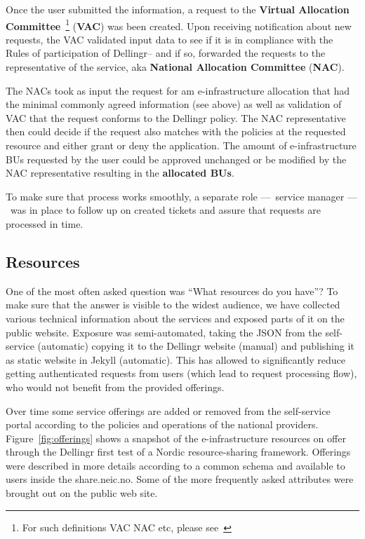 \documentclass{article}
\newcommand{\dell}{Dellingr\xspace}
\newcommand{\einfra}{e-infrastructure\xspace}
\newcommand{\np}{national provider\xspace}
\newcommand{\nps}{\np{s}\xspace}
\newcommand{\pilot}{first test of a Nordic resource-sharing framework\xspace}
\begin{document}
Once the user submitted the information, a request to the \textbf{Virtual Allocation Committee}~\footnote{For such definitions VAC NAC etc, please see~\cite{dellingr-p2-do5}} (\textbf{VAC}) was been created. 
Upon receiving notification about new requests, the VAC validated input data to see if it is in compliance
with the Rules of participation of \dell -- and if so, forwarded the requests to the representative of the service,
aka \textbf{National Allocation Committee} (\textbf{NAC}).

The NACs took as input the request for am \einfra allocation that had the minimal commonly agreed information (see above)
as well as validation of VAC that the request conforms to the \dell policy. 
The NAC representative then could decide if the request also matches with
the policies at the requested resource and either grant or deny the application.
The amount of \einfra BUs requested by the user could be approved unchanged or be modified by the NAC representative resulting in the {\bf allocated BUs}.

To make sure that process works smoothly, a separate role –– service manager –– was in place to follow up on created tickets and assure that requests are processed in time.

\subsection{Resources}

One of the most often asked question was ``What resources do you have''?
To make sure that the answer is visible to the widest audience, we have collected various
technical information about the services and exposed parts of it on the public website.
Exposure was semi-automated, taking the JSON from the self-service (automatic) copying it to
the \dell website (manual) and publishing it as static website in Jekyll (automatic).
This has allowed to significantly reduce getting authenticated requests from users (which lead to request processing flow), who would not benefit from the provided offerings.  

Over time some service offerings are added or removed from the self-service portal according to the
policies and operations of the \nps.
Figure~\ref{fig:offerings} shows a snapshot of the \einfra resources on offer through the \dell \pilot.
Offerings were described in more details according to a common schema and available to users inside the share.neic.no. Some of the more frequently asked attributes were brought out on the public web site.
\end{document}
